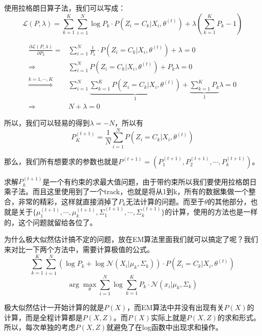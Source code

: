 \documentclass[a4paper]{article}
\begin{document}
使用拉格朗日算子法，我们可以写成：
\begin{equation}
    \mathcal{L}(P,\lambda) = \sum_{k=1}^K \sum_{i=1}^N  \log P_{k} \cdot P(Z_i = C_k|X_i,\theta^{(t)}) + \lambda(\sum_{k=1}^K P_k - 1)
\end{equation}

\begin{equation}
    \begin{split}
        \frac{\partial \mathcal{L}(P,\lambda)}{\partial P_k} = & \sum_{i=1}^N \frac{1}{P_k} \cdot P(Z_i = C_k|X_i,\theta^{(t)}) + \lambda = 0  \\
        \Rightarrow & \sum_{i=1}^N P(Z_i = C_k|X_i,\theta^{(t)}) + P_k \lambda = 0 \\
        \stackrel{k = 1,\cdots,K}{\Longrightarrow} & \sum_{i=1}^N\underbrace{\sum_{k=1}^K P(Z_i = C_k|X_i,\theta^{(t)})}_{1} + \underbrace{\sum_{k=1}^K P_k}_{1} \lambda = 0 \\
        \Rightarrow & N+\lambda = 0 
    \end{split}
\end{equation}

所以，我们可以轻易的得到$\lambda = -N$，所以有
\begin{equation}
    P_K^{(t+1)} = \frac{1}{N} \sum_{i=1}^N P(Z_i = C_k | X_i,\theta^{(t)})
\end{equation}

那么，我们所有想要求的参数也就是$P^{(t+1)} = (P_1^{(t+1)},P_2^{(t+1)},\cdots,P_k^{(t+1)})$。

求解$P_k^{(t+1)}$是一个有约束的求最大值问题，由于带约束所以我们要使用拉格朗日乘子法。而且这里使用到了一个track，也就是将从1到k，所有的数据集做一个整合，非常的精彩，这样就直接消掉了$P_k$无法计算的问题。而至于$\theta$的其他部分，也就是关于$\{ \mu_1^{(t+1)}, \cdots, \mu_k^{(t+1)},\Sigma_1^{(t+1)},\cdots,\Sigma_k^{(t+1)} \}$的计算，使用的方法也是一样的，这个问题就留给各位了。

为什么极大似然估计搞不定的问题，放在EM算法里面我们就可以搞定了呢？我们来对比一下两个方法中，需要计算极值的公式。
\begin{equation}
    \sum_{k=1}^K \sum_{i=1}^N \left( \log P_{k} + \log  \mathcal{N}(X_i|\mu_{k},\Sigma_{k}) \right) \cdot P(Z_i = C_k|X_i,\theta^{(t)})
\end{equation}
\begin{equation}
    \arg\max_{\theta}  \sum_{i=1}^N  \log \sum_{k=1}^K P_k \cdot \mathcal{N}(x_i|\mu_k,\Sigma_k)
\end{equation}

极大似然估计一开始计算的就是$P(X)$，而EM算法中并没有出现有关$P(X)$的计算，而是全程计算都是$P(X,Z)$。而$P(X)$实际上就是$P(X,Z)$的求和形式。所以，每次单独的考虑$P(X,Z)$就避免了在log函数中出现求和操作。
\end{document}
